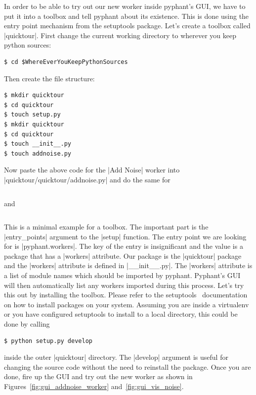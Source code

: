 \documentclass[a4paper]{article}
\begin{document}
In order to be able to try out our new worker inside pyphant's GUI, we
have to put it into a toolbox and tell pyphant about its
existence. This is done using the entry point mechanism from the
setuptools\cite{setuptools} package. Let's create a toolbox called
|quicktour|. First change the current working directory to wherever
you keep python sources:
\begin{verbatim}
$ cd $WhereEverYouKeepPythonSources
\end{verbatim}
Then create the file structure:
\begin{verbatim}
$ mkdir quicktour
$ cd quicktour
$ touch setup.py
$ mkdir quicktour
$ cd quicktour
$ touch __init__.py
$ touch addnoise.py
\end{verbatim}
Now paste the above code for the |Add Noise| worker into
|quicktour/quicktour/addnoise.py| and do the same for
\inputminted[linenos]{python}{api005.py}
and
\inputminted[linenos]{python}{api006.py}
This is a minimal example for
a toolbox. The important part is the |entry_points| argument to the
|setup| function. The entry point we are looking for is
|pyphant.workers|. The key of the entry is insignificant and the value
is a package that has a |workers| attribute. Our package is the
|quicktour| package and the |workers| attribute is defined in
|__init__.py|. The |workers| attribute is a list of module names which
should be imported by pyphant. Pyphant's GUI will then automatically
list any workers imported during this process. Let's try this out by
installing the toolbox. Please refer to the
setuptools~\cite{setuptools} documentation on how to install packages
on your system. Assuming you are inside a virtualenv or you have
configured setuptools to install to a local directory, this could be
done by calling
\begin{verbatim}
$ python setup.py develop
\end{verbatim}
inside the outer |quicktour| directory. The |develop| argument is
useful for changing the source code without the need to reinstall the
package. Once you are done, fire up the GUI and try out the new worker
as shown in Figures~\ref{fig:gui_addnoise_worker}
and~\ref{fig:gui_vis_noise}.
\end{document}
